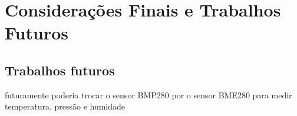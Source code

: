 \chapter{Considerações Finais e Trabalhos Futuros}

\lipsum[1-2]
 
\section{Trabalhos futuros}

futuramente poderia trocar o sensor BMP280 por o sensor BME280 para medir temperatura, pressão e humidade

\lipsum[55]